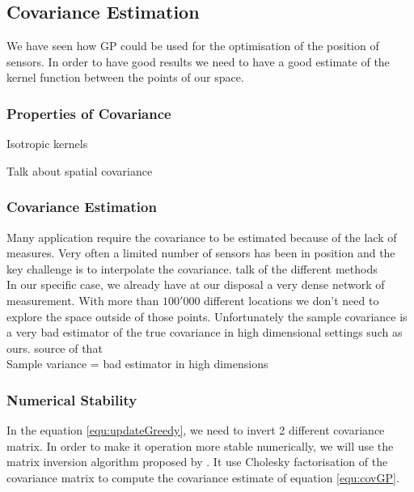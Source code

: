 \documentclass[12pt,twoside]{report}
\begin{document}
\subsection{Covariance Estimation} \label{sec:cov_est}

We have seen how GP could be used for the optimisation of the position of sensors. In order to have good results we need to have a good estimate of the kernel function between the points of our space. 



\subsubsection{Properties of Covariance}

Isotropic kernels

Talk about spatial covariance \cite{cressie_statistics_1991}



\subsubsection{Covariance Estimation}
Many application require the covariance to be estimated because of the lack of measures. Very often a limited number of sensors has been in position and the key challenge is to interpolate the covariance. talk of the different methods\\

In our specific case, we already have at our disposal a very dense network of measurement. With more than $100'000$ different locations we don't need to explore the space outside of those points. Unfortunately the sample covariance is a very bad estimator of the true covariance in high dimensional settings such as ours. source of that \\




Sample variance = bad estimator in high dimensions



\subsubsection{Numerical Stability}

In the equation \ref{equ:updateGreedy}, we need to invert 2 different covariance matrix. In order to make it operation more stable numerically, we will use the matrix inversion algorithm proposed by \cite[p.~19]{rasmussen_gaussian_2006}. It use Cholesky factorisation of the covariance matrix to compute the covariance estimate of equation \ref{equ:covGP}. 
\end{document}
